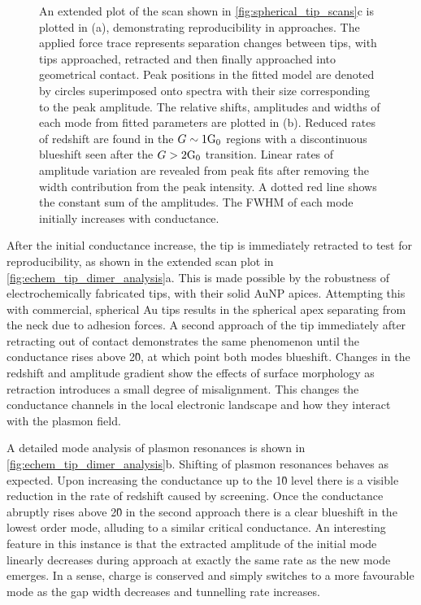 \documentclass[a4paper, 11pt]{article}
\begin{document}
\begin{figure}[bt]
{An extended plot of the  scan shown in \autoref{fig:spherical_tip_scans}c is plotted in (a), demonstrating reproducibility in approaches. The applied force trace represents separation changes between tips, with tips approached, retracted and then finally approached into geometrical contact. Peak positions in the fitted model are denoted by circles superimposed onto spectra with their size corresponding to the peak amplitude. The relative shifts, amplitudes and widths of each mode from fitted parameters are plotted in (b). Reduced rates of redshift are found in the $G\sim1\mathrm{G_{0}}$ regions with a discontinuous blueshift seen after the $G>2\mathrm{G_{0}}$ transition. Linear rates of amplitude variation are revealed from peak fits after removing the width contribution from the peak intensity. A dotted red line shows the constant sum of the amplitudes. The FWHM of each mode initially increases with conductance.}
\label{fig:echem_tip_dimer_analysis}
\end{figure}

After the initial conductance increase, the tip is immediately retracted to test for reproducibility, as shown in the extended scan plot in \autoref{fig:echem_tip_dimer_analysis}a. This is made possible by the robustness of electrochemically fabricated tips, with their solid AuNP apices. Attempting this with commercial, spherical Au tips results in the spherical apex separating from the neck due to adhesion forces. A second approach of the tip immediately after retracting out of contact demonstrates the same phenomenon until the conductance rises above 2\G0, at which point both modes blueshift. Changes in the redshift and amplitude gradient show the effects of surface morphology as retraction introduces a small degree of misalignment. This changes the conductance channels in the local electronic landscape and how they interact with the plasmon field.

A detailed mode analysis of plasmon resonances is shown in \autoref{fig:echem_tip_dimer_analysis}b. Shifting of plasmon resonances behaves as expected. Upon increasing the conductance up to the 1\G0 level there is a visible reduction in the rate of redshift caused by screening. Once the conductance abruptly rises above 2\G0 in the second approach there is a clear blueshift in the lowest order mode, alluding to a similar critical conductance. An interesting feature in this instance is that the extracted amplitude of the initial mode linearly decreases during approach at exactly the same rate as the new mode emerges. In a sense, charge is conserved and simply switches to a more favourable mode as the gap width decreases and tunnelling rate increases.
\end{document}
